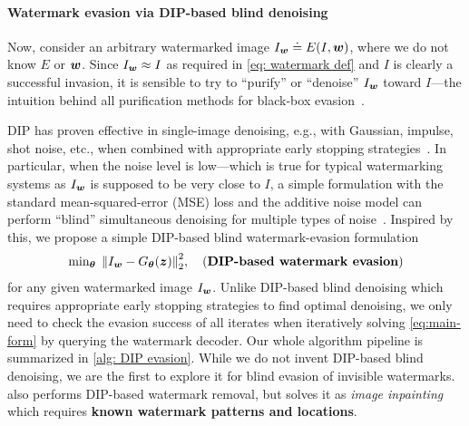 \paragraph{Watermark evasion via DIP-based blind denoising}

Now, consider an arbitrary watermarked image $I_{\boldsymbol w} \doteq E(I, \boldsymbol w)$, where we do not know $E$ or $\boldsymbol w$. Since $I_{\boldsymbol w} \approx I$ as required in \cref{eq: watermark def} and $I$ is clearly a successful invasion, it is sensible to try to ``purify'' or ``denoise'' $I_{\boldsymbol w}$ toward $I$---the intuition behind all purification methods for black-box evasion~\citep{dabov2007image,saberi2023robustness,zhao2023invisible}. 

DIP has proven effective in single-image denoising, e.g., with Gaussian, impulse, shot noise, etc., when combined with appropriate early stopping strategies~\citep{mataev2019deepred,DBLP_conf_iccv_JoCC21,li2021self,wang2021early,li2023deep,li_random_2023,jdd_doubledip}. In particular, when the noise level is low---which is true for typical watermarking systems as $I_{\boldsymbol w}$ is supposed to be very close to $I$, a simple formulation with the standard mean-squared-error (MSE) loss and the additive noise model can perform ``blind'' simultaneous denoising for multiple types of noise~\cite{li2021self,wang2021early}. Inspired by this, we propose a simple DIP-based blind watermark-evasion formulation 
\begin{align} \label{eq:main-form}
    \min\nolimits_{\boldsymbol \theta} \; \norm{I_{\boldsymbol w} - G_{\boldsymbol \theta}(\boldsymbol z)}_2^2,  \quad (\textbf{DIP-based watermark evasion})
\end{align}
for any given watermarked image $I_{\boldsymbol w}$. Unlike DIP-based blind denoising which requires appropriate early stopping strategies to find optimal denoising, we only need to check the evasion success of all iterates when iteratively solving \cref{eq:main-form} by querying the watermark decoder. Our whole algorithm pipeline is summarized in \cref{alg: DIP evasion}. While we do not invent DIP-based blind denoising, we are the first to explore it for blind evasion of invisible watermarks. \cite{braindotai2021watermark} also performs DIP-based watermark removal, but solves it as \emph{image inpainting} which requires \textbf{known watermark patterns and locations}. 

